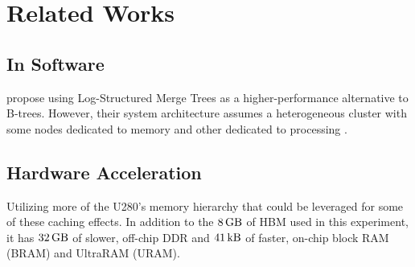 \section{Related Works}

\subsection{In Software}

\citeauthor{dlsm} propose using Log-Structured Merge Trees as a higher-performance alternative to B-trees. However, their system architecture assumes a heterogeneous cluster with some nodes dedicated to memory and other dedicated to processing \cite{dlsm}.


\subsection{Hardware Acceleration}

Utilizing more of the U280's memory hierarchy that could be leveraged for some of these caching effects. In addition to the $\SI{8}{\giga\byte}$ of HBM used in this experiment, it has $\SI{32}{\giga\byte}$ of slower, off-chip DDR and $\SI{41}{\kilo\byte}$ of faster, on-chip block RAM (BRAM) and UltraRAM (URAM).
